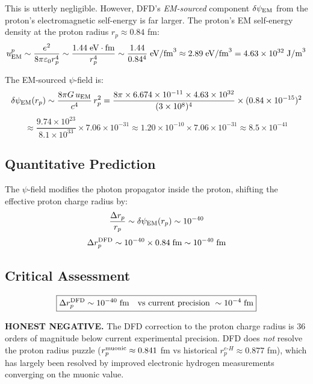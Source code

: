 \documentclass[11pt]{article}
\begin{document}
This is utterly negligible.  However, DFD's \emph{EM-sourced}
component $\delta\psi_{\rm EM}$ from the proton's electromagnetic
self-energy is far larger.  The proton's EM self-energy density at
the proton radius $r_p \approx 0.84$ fm:
\begin{equation}
u_{\rm EM}^p \sim \frac{e^2}{8\pi\varepsilon_0 r_p^4}
\sim \frac{1.44\;\text{eV}\cdot\text{fm}}{r_p^4}
\sim \frac{1.44}{0.84^4}\;\text{eV/fm}^3
\approx 2.89\;\text{eV/fm}^3
= 4.63 \times 10^{32}\;\text{J/m}^3
\end{equation}

The EM-sourced $\psi$-field is:
\begin{equation}
\delta\psi_{\rm EM}(r_p) \sim \frac{8\pi G\,u_{\rm EM}}{c^4}\,r_p^2
= \frac{8\pi \times 6.674 \times 10^{-11} \times 4.63 \times 10^{32}}
{(3 \times 10^8)^4} \times (0.84 \times 10^{-15})^2
\end{equation}
\begin{equation}
\approx \frac{9.74 \times 10^{23}}{8.1 \times 10^{33}} \times 7.06 \times 10^{-31}
\approx 1.20 \times 10^{-10} \times 7.06 \times 10^{-31}
\approx 8.5 \times 10^{-41}
\end{equation}

\subsection{Quantitative Prediction}

The $\psi$-field modifies the photon propagator inside the proton,
shifting the effective proton charge radius by:
\begin{equation}
\frac{\Delta r_p}{r_p} \sim \delta\psi_{\rm EM}(r_p) \sim 10^{-40}
\end{equation}
\begin{equation}
\Delta r_p^{\rm DFD} \sim 10^{-40} \times 0.84\;\text{fm} \sim 10^{-40}\;\text{fm}
\end{equation}

\subsection{Critical Assessment}

\begin{equation}
\boxed{
\Delta r_p^{\rm DFD} \sim 10^{-40}\;\text{fm}
\quad\text{vs current precision } \sim 10^{-4}\;\text{fm}
}
\end{equation}

\textbf{HONEST NEGATIVE.}  The DFD correction to the proton charge
radius is 36 orders of magnitude below current experimental precision.
DFD does \emph{not} resolve the proton radius puzzle ($r_p^{\rm muonic}
\approx 0.841$ fm vs historical $r_p^{e\text{-}H} \approx 0.877$ fm),
which has largely been resolved by improved electronic hydrogen
measurements converging on the muonic value.
\end{document}
